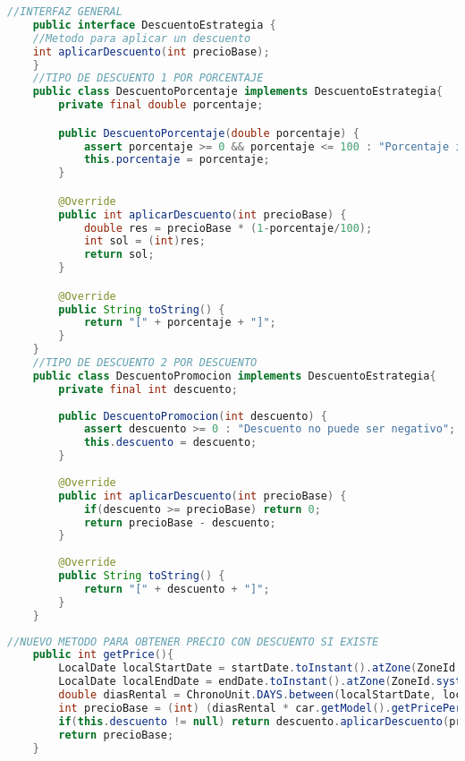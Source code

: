 \begin{lstlisting}[style = javaNormal, language=Java] 
    //INTERFAZ GENERAL
    public interface DescuentoEstrategia {
    //Metodo para aplicar un descuento
    int aplicarDescuento(int precioBase);
    }
    //TIPO DE DESCUENTO 1 POR PORCENTAJE
    public class DescuentoPorcentaje implements DescuentoEstrategia{
        private final double porcentaje;

        public DescuentoPorcentaje(double porcentaje) {
            assert porcentaje >= 0 && porcentaje <= 100 : "Porcentaje invalido";
            this.porcentaje = porcentaje;
        }

        @Override
        public int aplicarDescuento(int precioBase) {
            double res = precioBase * (1-porcentaje/100);
            int sol = (int)res;
            return sol;
        }

        @Override
        public String toString() {
            return "[" + porcentaje + "]";
        }
    }
    //TIPO DE DESCUENTO 2 POR DESCUENTO 
    public class DescuentoPromocion implements DescuentoEstrategia{
        private final int descuento;
    
        public DescuentoPromocion(int descuento) {
            assert descuento >= 0 : "Descuento no puede ser negativo";
            this.descuento = descuento;
        }
    
        @Override
        public int aplicarDescuento(int precioBase) {
            if(descuento >= precioBase) return 0;
            return precioBase - descuento;
        }
    
        @Override
        public String toString() {
            return "[" + descuento + "]";
        }      
    }
\end{lstlisting}
\begin{lstlisting}[style = javaNormal, language=Java] 
    //NUEVO METODO PARA OBTENER PRECIO CON DESCUENTO SI EXISTE
    public int getPrice(){
        LocalDate localStartDate = startDate.toInstant().atZone(ZoneId.systemDefault()).toLocalDate();
        LocalDate localEndDate = endDate.toInstant().atZone(ZoneId.systemDefault()).toLocalDate();
        double diasRental = ChronoUnit.DAYS.between(localStartDate, localEndDate);
        int precioBase = (int) (diasRental * car.getModel().getPricePerDay());
        if(this.descuento != null) return descuento.aplicarDescuento(precioBase);
        return precioBase;
    }
\end{lstlisting}
